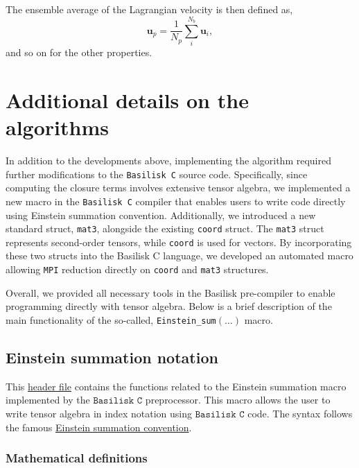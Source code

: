 The ensemble average of the Lagrangian velocity is then defined as, 
\begin{equation}
  \textbf{u}_p = \frac{1}{N_p}\sum^{N_b}_i \textbf{u}_i, 
\end{equation}
and so on for the other properties. 

\section{Additional details on the algorithms}
In addition to the developments above, implementing the algorithm required further modifications to the \texttt{Basilisk C} source code. 
Specifically, since computing the closure terms involves extensive tensor algebra, we implemented a new macro in the \texttt{Basilisk C} compiler that enables users to write code directly using Einstein summation convention. 
Additionally, we introduced a new standard struct, \texttt{mat3}, alongside the existing \texttt{coord} struct. 
The \texttt{mat3} struct represents second-order tensors, while \texttt{coord} is used for vectors. 
By incorporating these two structs into the Basilisk C language, we developed an automated macro allowing \texttt{MPI} reduction directly on \texttt{coord} and \texttt{mat3} structures. 

Overall, we provided all necessary tools in the Basilisk pre-compiler to enable programming directly with tensor algebra.
Below is a brief description of the main functionality of the so-called, \texttt{Einstein\_sum}$(\ldots)$ macro.

\subsection{Einstein summation notation}

This \href{http://basilisk.fr/src/ast/einstein_sum.h}{header file} contains the functions related to the Einstein summation macro implemented by the $\texttt{Basilisk C}$ preprocessor. This macro allows the user to write tensor algebra in index notation using $\texttt{Basilisk C}$ code. The syntax follows the famous \href{https://en.wikipedia.org/wiki/Einstein\_notation}{Einstein summation convention}.

\subsubsection{ Mathematical definitions}

